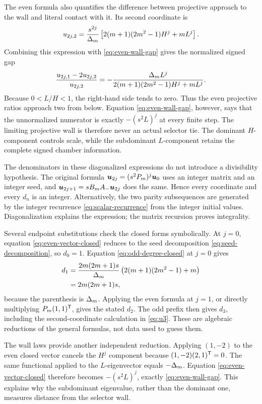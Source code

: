 \documentclass[11pt]{article}
\theoremstyle{definition}
\theoremstyle{remark}
\begin{document}
The even formula also quantifies the difference between projective approach
to the wall and literal contact with it.  Its second coordinate is
\[
u_{2j,2}=\frac{s^{2j}}{\Delta_m}\left[
2(m+1)(2m^2-1)H^j+mL^j\right].
\]
Combining this expression with \eqref{eq:even-wall-gap} gives the normalized
signed gap
\begin{equation}
\frac{u_{2j,1}-2u_{2j,2}}{u_{2j,2}}
=-\frac{\Delta_m L^j}
{2(m+1)(2m^2-1)H^j+mL^j}.
\label{eq:normalized-even-wall-gap}
\end{equation}
Because \(0<L/H<1\), the right-hand side tends to zero.  Thus the even
projective ratios approach two from below.  Equation
\eqref{eq:even-wall-gap}, however, says that the unnormalized numerator is
exactly \(-(s^2L)^j\) at every finite step.  The limiting projective wall is
therefore never an actual selector tie.  The dominant \(H\)-component
controls scale, while the subdominant \(L\)-component retains the complete
signed chamber information.

The denominators in these diagonalized expressions do not introduce a
divisibility hypothesis.  The original formula
\(\boldsymbol{u}_{2j}=(s^2P_m)^j\boldsymbol{u}_0\) uses an integer matrix and an integer seed, and
\(\boldsymbol{u}_{2j+1}=sB_mA_{-}\boldsymbol{u}_{2j}\) does the same.  Hence every coordinate and
every \(d_n\) is an integer.  Alternatively, the two parity subsequences are
generated by the integer recurrence \eqref{eq:scalar-recurrence} from the
integer initial values.  Diagonalization explains the expression; the
matrix recursion proves integrality.

Several endpoint substitutions check the closed forms symbolically.  At
\(j=0\), equation \eqref{eq:even-vector-closed} reduces to the seed
decomposition \eqref{eq:seed-decomposition}, so \(d_0=1\).  Equation
\eqref{eq:odd-degree-closed} at \(j=0\) gives
\begin{align*}
d_1
&=\frac{2m(2m+1)s}{\Delta_m}
  \left(2(m+1)(2m^2-1)+m\right)\\
&=2m(2m+1)s,
\end{align*}
because the parenthesis is \(\Delta_m\).  Applying the even formula at
\(j=1\), or directly multiplying \(P_m(1,1)^{\mathsf{T}}\), gives the stated
\(d_2\).  The odd prefix then gives \(d_3\), including the second-coordinate
calculation in \eqref{eq:u3}.  These are algebraic reductions of the general
formulas, not data used to guess them.

The wall laws provide another independent reduction.  Applying
\((1,-2)\) to the even closed vector cancels the \(H^j\) component because
\((1,-2)(2,1)^{\mathsf{T}}=0\).  The same functional applied to the
\(L\)-eigenvector equals \(-\Delta_m\).  Equation
\eqref{eq:even-vector-closed} therefore becomes
\(-(s^2L)^j\), exactly \eqref{eq:even-wall-gap}.  This explains why the
subdominant eigenvalue, rather than the dominant one, measures distance from
the selector wall.
\end{document}
